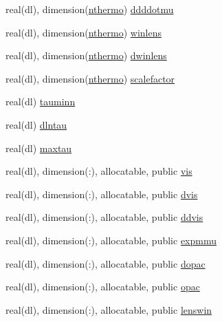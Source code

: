 \begin{DoxyCompactItemize}
\item 
real(dl), dimension(\mbox{\hyperlink{namespacethermodata_ab5a6325bede2b0cce4e867e9e1e18215}{nthermo}}) \mbox{\hyperlink{namespacethermodata_a679a88090aed732261c9ca690eddfe2b}{ddddotmu}}
\item 
real(dl), dimension(\mbox{\hyperlink{namespacethermodata_ab5a6325bede2b0cce4e867e9e1e18215}{nthermo}}) \mbox{\hyperlink{namespacethermodata_af11b78439f1e2243328bb5c4b111af76}{winlens}}
\item 
real(dl), dimension(\mbox{\hyperlink{namespacethermodata_ab5a6325bede2b0cce4e867e9e1e18215}{nthermo}}) \mbox{\hyperlink{namespacethermodata_a52362e5ab75ec6515f8b1b142b69ed8a}{dwinlens}}
\item 
real(dl), dimension(\mbox{\hyperlink{namespacethermodata_ab5a6325bede2b0cce4e867e9e1e18215}{nthermo}}) \mbox{\hyperlink{namespacethermodata_a6f460accce66697aeae2188276198cdb}{scalefactor}}
\item 
real(dl) \mbox{\hyperlink{namespacethermodata_a68569d7c6ff02b02a4025f86a42c0d7e}{tauminn}}
\item 
real(dl) \mbox{\hyperlink{namespacethermodata_a9a43caa2003542f5a28e6f2280515365}{dlntau}}
\item 
real(dl) \mbox{\hyperlink{namespacethermodata_a41426412f674a69c99b7756938fc4204}{maxtau}}
\item 
real(dl), dimension(\+:), allocatable, public \mbox{\hyperlink{namespacethermodata_a14ddce36570d0e50813dc92cd05b57bf}{vis}}
\item 
real(dl), dimension(\+:), allocatable, public \mbox{\hyperlink{namespacethermodata_a4e5d2a5cf09e04bba23defc7dcf9e967}{dvis}}
\item 
real(dl), dimension(\+:), allocatable, public \mbox{\hyperlink{namespacethermodata_aeab1ddb31ee9b39dd71d1a5a833b85f6}{ddvis}}
\item 
real(dl), dimension(\+:), allocatable, public \mbox{\hyperlink{namespacethermodata_ab0ba79e6faa7c3d30e4b3a029b832d81}{expmmu}}
\item 
real(dl), dimension(\+:), allocatable, public \mbox{\hyperlink{namespacethermodata_aa627075f6104ddf2acd8968688ec6f7e}{dopac}}
\item 
real(dl), dimension(\+:), allocatable, public \mbox{\hyperlink{namespacethermodata_af824d4275dd6ae8475c82829c96c505c}{opac}}
\item 
real(dl), dimension(\+:), allocatable, public \mbox{\hyperlink{namespacethermodata_a60473ac86869f6f9da92e4b0f76c5b12}{lenswin}}
\item 

\end{DoxyCompactItemize}
